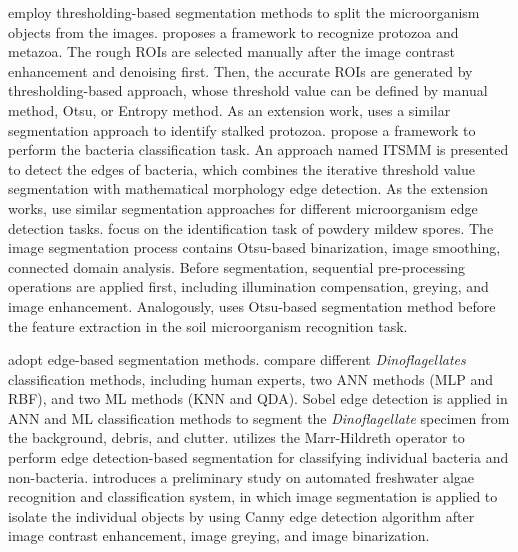 \cite{Ginoris-2007-RPMU,Amaral-2008-SPII,Xiaojuan-2007-ANBC,Xiaojuan-2007-ANBR,Xiaojuan-2008-ANWB,Cunshe-2008-ANWB,Xiaojuan-2009-AIBN,Danping-2013-IPMS,Kruk-2015-CCSI} employ thresholding-based segmentation methods to split the microorganism objects from the images. \cite{Ginoris-2007-RPMU} proposes a framework to recognize protozoa and metazoa. The rough ROIs are selected manually after the image contrast enhancement and denoising first. Then, the accurate ROIs are generated by thresholding-based approach, whose threshold value can be defined by manual method, Otsu, or Entropy method. As an extension work, \cite{Amaral-2008-SPII} uses a similar segmentation approach to identify stalked protozoa. \cite{Xiaojuan-2007-ANBC,Xiaojuan-2007-ANBR} propose a framework to perform the bacteria classification task. An approach named ITSMM is presented to detect the edges of bacteria, which combines the iterative threshold value segmentation with mathematical morphology edge detection. As the extension works, \cite{Xiaojuan-2008-ANWB,Cunshe-2008-ANWB,Xiaojuan-2009-AIBN} use similar segmentation approaches for different microorganism edge detection tasks. \cite{Danping-2013-IPMS} focus on the identification task of powdery mildew spores. The image segmentation process contains Otsu-based binarization, image smoothing, connected domain analysis. Before segmentation, sequential pre-processing operations are applied first, including illumination compensation, greying, and image enhancement. Analogously, \cite{Kruk-2015-CCSI} uses Otsu-based segmentation method before the feature extraction in the soil microorganism recognition task. 


\cite{Culverhouse-1996-ACFD,Blackburn-1998-RDBA,Mosleh-2012-APSA} adopt edge-based segmentation methods. \cite{Culverhouse-1996-ACFD} compare different \emph{Dinoflagellates} classification methods, including human experts, two ANN methods (MLP and RBF), and two ML methods (KNN and QDA). Sobel edge detection is applied in ANN and ML classification methods to segment the \emph{Dinoflagellate} specimen from the background, debris, and clutter. \cite{Blackburn-1998-RDBA} utilizes the Marr-Hildreth operator to perform edge detection-based segmentation for classifying individual bacteria and non-bacteria. \cite{Mosleh-2012-APSA} introduces a preliminary study on automated freshwater algae recognition and classification system, in which image segmentation is applied to isolate the individual objects by using Canny edge detection algorithm after image contrast enhancement, image greying, and image binarization.



